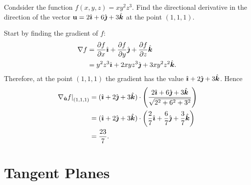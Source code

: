 \documentclass[../multivariate_calculus.tex]{subfiles}
\begin{document}
        \begin{example}
            Condsider the function $f(x,y,z)=xy^2z^3$.
            Find the directional derivative in the direction of the vector $\mathbf{u}=2\hat{\boldsymbol{\imath}}+6\hat{\boldsymbol{\jmath}}+3\hat{\boldsymbol{k}}$ at the point $(1,1,1)$.
            
            Start by finding the gradient of $f$:
            \begin{align}
                \nabla f&=\frac{\partial f}{\partial x}\hat{\boldsymbol{\imath}}+\frac{\partial f}{\partial y}\hat{\boldsymbol{\jmath}}+\frac{\partial f}{\partial z}\hat{\boldsymbol{k}}\\
                &=y^2z^3\hat{\boldsymbol{\imath}}+2xyz^3\hat{\boldsymbol{\jmath}}+3xy^2z^2\hat{\boldsymbol{k}}.
            \end{align}
            Therefore, at the point $(1,1,1)$ the gradient has the value $\hat{\boldsymbol{\imath}}+2\hat{\boldsymbol{\jmath}}+3\hat{\boldsymbol{k}}$.
            Hence
            \begin{align}
                \left.\nabla_{\mathbf{\hat{u}}}f\right|_{(1,1,1)}&=(\hat{\boldsymbol{\imath}}+2\hat{\boldsymbol{\jmath}}+3\hat{\boldsymbol{k}})\cdot\left(\frac{2\hat{\boldsymbol{\imath}}+6\hat{\boldsymbol{\jmath}}+3\hat{\boldsymbol{k}}}{\sqrt{2^2+6^2+3^2}}\right)\\
                &=(\hat{\boldsymbol{\imath}}+2\hat{\boldsymbol{\jmath}}+3\hat{\boldsymbol{k}})\cdot\left(\frac{2}{7}\hat{\boldsymbol{\imath}}+\frac{6}{7}\hat{\boldsymbol{\jmath}}+\frac{3}{7}\hat{\boldsymbol{k}}\right)\\
                &=\frac{23}{7}.
            \end{align}
        \end{example}
    
    \section{Tangent Planes}
\end{document}
